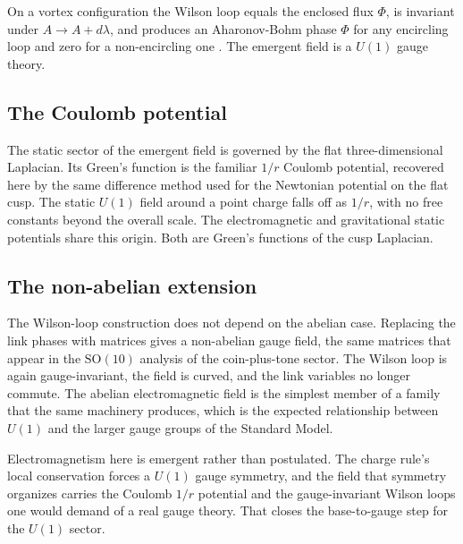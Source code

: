 \begin{result}
On a vortex configuration the Wilson loop equals the enclosed flux $\Phi$, is invariant under $A \to A + d\lambda$, and produces an Aharonov-Bohm phase $\Phi$ for any encircling loop and zero for a non-encircling one \cite{pollard2026vibetest}. The emergent field is a $U(1)$ gauge theory.
\end{result}

\subsection{The Coulomb potential}

The static sector of the emergent field is governed by the flat three-dimensional Laplacian. Its Green's function is the familiar $1/r$ Coulomb potential, recovered here by the same difference method used for the Newtonian potential on the flat cusp. The static $U(1)$ field around a point charge falls off as $1/r$, with no free constants beyond the overall scale. The electromagnetic and gravitational static potentials share this origin. Both are Green's functions of the cusp Laplacian.

\subsection{The non-abelian extension}

The Wilson-loop construction does not depend on the abelian case. Replacing the link phases with matrices gives a non-abelian gauge field, the same matrices that appear in the $\mathrm{SO}(10)$ analysis of the coin-plus-tone sector. The Wilson loop is again gauge-invariant, the field is curved, and the link variables no longer commute. The abelian electromagnetic field is the simplest member of a family that the same machinery produces, which is the expected relationship between $U(1)$ and the larger gauge groups of the Standard Model.


Electromagnetism here is emergent rather than postulated. The charge rule's local conservation forces a $U(1)$ gauge symmetry, and the field that symmetry organizes carries the Coulomb $1/r$ potential and the gauge-invariant Wilson loops one would demand of a real gauge theory. That closes the base-to-gauge step for the $U(1)$ sector.
